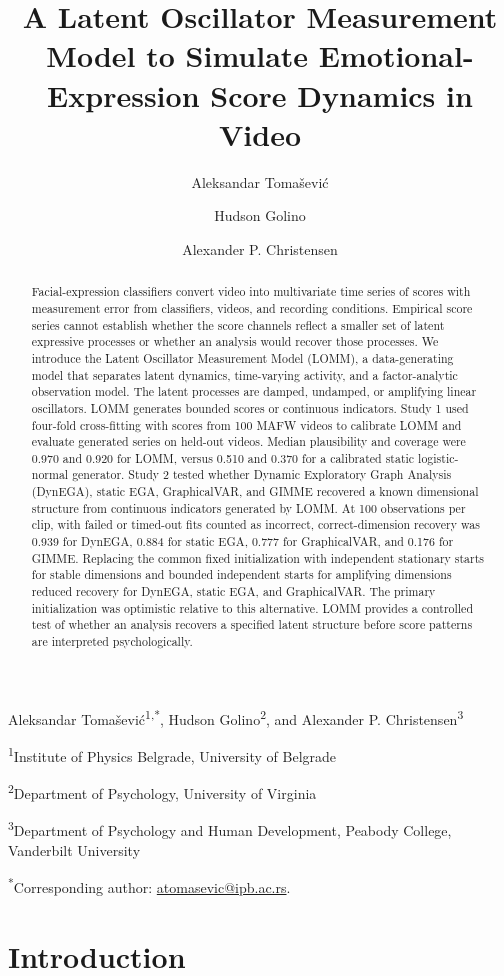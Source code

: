 \documentclass[
]{article}
\title{A Latent Oscillator Measurement Model to Simulate
Emotional-Expression Score Dynamics in Video}
\author{Aleksandar Tomašević \and Hudson Golino \and Alexander P.
Christensen}
\date{}
\makeatletter
\renewcommand{\maketitle}{%
  \begin{center}
  {\Large\bfseries \@title\par}\vspace{1em}
  Aleksandar Tomašević\textsuperscript{1,*}, Hudson Golino\textsuperscript{2}, and
  Alexander P. Christensen\textsuperscript{3}\par\vspace{0.5em}
  {\small
  \textsuperscript{1}Institute of Physics Belgrade, University of Belgrade\par
  \textsuperscript{2}Department of Psychology, University of Virginia\par
  \textsuperscript{3}Department of Psychology and Human Development, Peabody College, Vanderbilt University\par}
  \end{center}
  \noindent \textsuperscript{*}Corresponding author: \href{mailto:atomasevic@ipb.ac.rs}{atomasevic@ipb.ac.rs}.\par
  \vspace{1em}
}
\makeatother
\begin{document}
\maketitle
\begin{abstract}
Facial-expression classifiers convert video into multivariate time
series of scores with measurement error from classifiers, videos, and
recording conditions. Empirical score series cannot establish whether
the score channels reflect a smaller set of latent expressive processes
or whether an analysis would recover those processes. We introduce the
Latent Oscillator Measurement Model (LOMM), a data-generating model that
separates latent dynamics, time-varying activity, and a factor-analytic
observation model. The latent processes are damped, undamped, or
amplifying linear oscillators. LOMM generates bounded scores or
continuous indicators. Study 1 used four-fold cross-fitting with scores
from 100 MAFW videos to calibrate LOMM and evaluate generated series on
held-out videos. Median plausibility and coverage were 0.970 and 0.920
for LOMM, versus 0.510 and 0.370 for a calibrated static logistic-normal
generator. Study 2 tested whether Dynamic Exploratory Graph Analysis
(DynEGA), static EGA, GraphicalVAR, and GIMME recovered a known
dimensional structure from continuous indicators generated by LOMM. At
100 observations per clip, with failed or timed-out fits counted as
incorrect, correct-dimension recovery was 0.939 for DynEGA, 0.884 for
static EGA, 0.777 for GraphicalVAR, and 0.176 for GIMME. Replacing the
common fixed initialization with independent stationary starts for
stable dimensions and bounded independent starts for amplifying
dimensions reduced recovery for DynEGA, static EGA, and GraphicalVAR.
The primary initialization was optimistic relative to this alternative.
LOMM provides a controlled test of whether an analysis recovers a
specified latent structure before score patterns are interpreted
psychologically.
\end{abstract}


\section{Introduction}\label{introduction}
\end{document}
